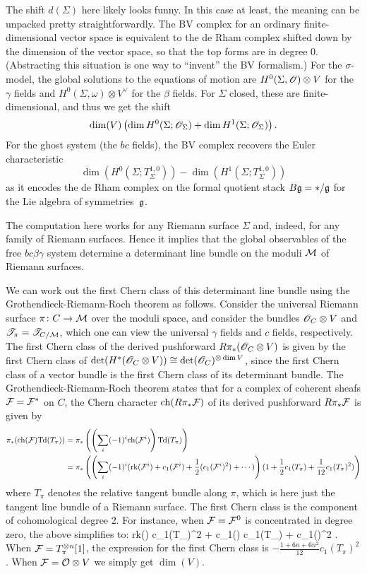 \begin{rmk}
The shift $d(\Sigma)$ here likely looks funny.
In this case at least, the meaning can be unpacked pretty straightforwardly. 
The BV complex for an ordinary finite-dimensional vector space is equivalent to the de Rham complex shifted down by the dimension of the vector space, 
so that the top forms are in degree 0.
(Abstracting this situation is one way to ``invent'' the BV formalism.)
For the $\sigma$-model, the global solutions to the equations of motion are $H^0(\Sigma,\mathscr O) \otimes V$ for the $\gamma$ fields and $H^0(\Sigma,\omega) \otimes V^\vee$ for the $\beta$ fields.
For $\Sigma$ closed, these are finite-dimensional, and thus we get the shift
\[
 \dim (V)  \left(\dim H^0(\Sigma ; \mathscr O_\Sigma) + \dim H^1(\Sigma ; \mathscr O_\Sigma)\right).
\]
For the ghost system (the $bc$ fields), 
the BV complex recovers the Euler characteristic 
\[
\dim(H^0(\Sigma ; T_\Sigma^{1,0})) - \dim(H^1(\Sigma ; T_\Sigma^{1,0}))
\]
as it encodes the de Rham complex on the formal quotient stack $B\mathfrak g = \ast/\mathfrak g$ for the Lie algebra of symmetries~$\mathfrak g$.
\end{rmk}

The computation here works for any Riemann surface $\Sigma$ and, indeed, for any family of Riemann surfaces.
Hence it implies that the global observables of the free $bc\beta\gamma$ system determine a determinant line bundle on the moduli $\mathcal M$ of Riemann surfaces.

We can work out the first Chern class of this determinant line bundle using the Grothendieck-Riemann-Roch theorem as follows.
Consider the universal Riemann surface $\pi \colon C \to \mathcal M$ over the moduli space, 
and consider the bundles $\mathscr O_C \otimes V$ and $\mathscr T_\pi = \mathscr T_{C/\mathcal M}$,
which one can view the universal $\gamma$ fields and $c$ fields, respectively.
The first Chern class of the derived pushforward $R\pi_*(\mathscr O_C \otimes V)$ is given by the first Chern class of $\det(H^*(\mathscr O_C \otimes V)) \cong \det(\mathscr O_C)^{\otimes \dim V}$, 
since the first Chern class of a vector bundle is the first Chern class of its determinant bundle.
The Grothendieck-Riemann-Roch theorem states that for a complex of coherent sheafs $\mathcal F = \mathcal F^*$ on $C$, 
the Chern character ${\rm ch}(R\pi_* \mathcal F)$ of its derived pushforward $R\pi_* \mathcal F$  is given by 
\def\Td{{\rm Td}}
\begin{align*}
\pi_*( \ch(\cF) \Td(T_\pi)) &= \pi_*\left( \left(\sum_{i} (-1)^i \ch (\cF^i) \right) \Td(T_\pi)\right) \\
&= \pi_*\left( \left(\sum_i (-1)^i ({\rm rk}(\cF^i) + c_1(\cF^i) + \frac{1}{2}(c_1(\cF^i)^2) + \cdots)\right) (1 +\frac{1}{2}c_1(T_\pi) + \frac{1}{12} c_1(T_\pi)^2)\right)
\end{align*}
where $T_\pi$ denotes the relative tangent bundle along $\pi$,
which is here just the tangent line bundle of a Riemann surface.
The first Chern class is the component of cohomological degree 2.
For instance, when $\mathcal F = \mathcal F^0$ is concentrated in degree zero, the above simplifies to:
\ben
{} {\rm rk}(\cF) c_1(T_\pi)^2 +  c_1(\cF) c_1(T_\pi) +  c_1(\cF)^2 .
\een  
When $\mathcal F = T^{\otimes n}_{\pi} [1]$, the expression for the first Chern class is $-\frac{1 + 6n + 6n^2}{12} c_1(T_\pi)^2$.
When $\mathcal F = \mathcal O \otimes V$ we simply get $\dim(V)$. 

